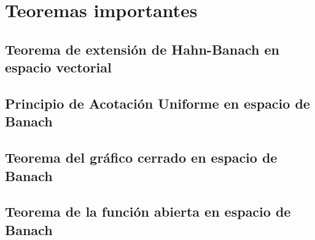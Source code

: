\chapter{Teoremas importantes}

\section{Teorema de extensión de Hahn-Banach en espacio vectorial}

\section{Principio de Acotación Uniforme en espacio de Banach}

\section{Teorema del gráfico cerrado en espacio de Banach}

\section{Teorema de la función abierta en espacio de Banach}